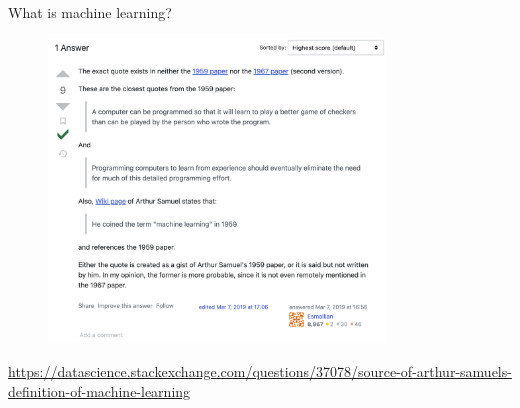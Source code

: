 \documentclass[xcolor={dvipsnames}, handout]{beamer}
\begin{document}
\begin{frame}{What is machine learning?}

\begin{figure}
\centering
\includegraphics[width = 0.8\textwidth]{../assets/samuel-refute-stackexchange.png}
\end{figure}

\url{https://datascience.stackexchange.com/questions/37078/source-of-arthur-samuels-definition-of-machine-learning}

\end{frame}





\end{document}
